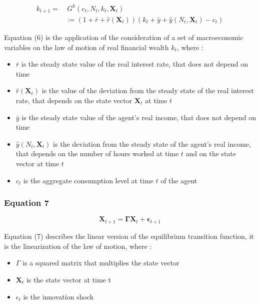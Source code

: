 \documentclass{article}
\begin{document}
\begin{equation}\tag{6}
    \begin{split}
        k_{t+1}= &\ G^{k}(c_{t},N_{t}, k_{t}, \bm{X}_{t}) \\ 
        & := (1+\bar{r}+\hat{r}(\bm{X}_{t}))(k_{t}+\bar{y}+\hat{y}(N_{t},\bm{X}_{t})-c_{t})
    \end{split}
\end{equation}

Equation (6) is the application of the consideration of a set of macroeconomic variables on the law of motion of real financial wealth $k_{t}$, where : 
\begin{itemize}
    \item $\bar{r}$ is the steady state value of the real interest rate, that does not depend on time
    \item $\hat{r}(\bm{X}_{t})$ is the value of the deviation from the steady state of the real interest rate, that depends on the state vector $\bm{X}_{t}$ at time $t$
    \item $\bar{y}$ is the steady state value of the agent's real income, that does not depend on time
    \item $\hat{y}(N_{t},\bm{X}_{t})$ is the deviation from the steady state of the agent's real income, that depends on the number of hours worked at time $t$ and on the state vector at time $t$
    \item $c_{t}$ is the aggregate consumption level at time $t$ of the agent
\end{itemize}

\subsubsection*{Equation 7}

\begin{equation}\tag{7}
    \bm{X}_{t+1}=\bm{\Gamma}\bm{X}_{t}+\bm{\epsilon}_{t+1}
\end{equation}

Equation (7) describes the linear version of the equilibrium transition function, it is the linearization of the law of motion, where :
\begin{itemize}
    \item $\Gamma$ is a squared matrix that multiplies the state vector
    \item $\bm{X}_t$ is the state vector at time t
    \item $\epsilon_{t}$ is the innovation shock
\end{itemize}
\end{document}
